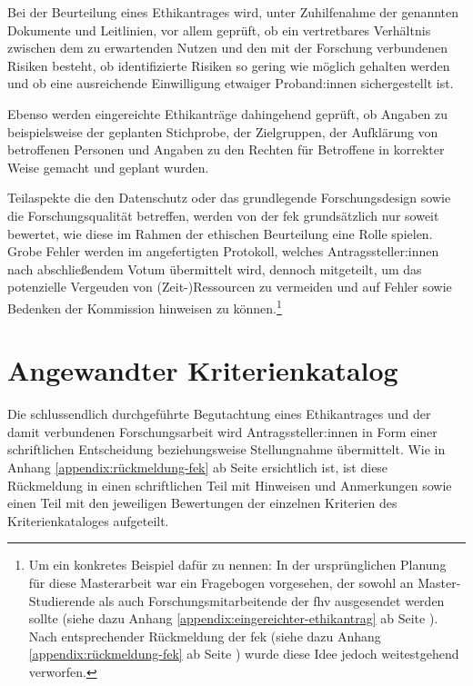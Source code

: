 \documentclass[a4paper,12pt,twoside]{scrreprt}
\begin{document}
Bei der Beurteilung eines Ethikantrages wird, unter Zuhilfenahme der genannten Dokumente und Leitlinien, vor allem geprüft, ob ein vertretbares Verhältnis zwischen dem zu erwartenden Nutzen und den mit der Forschung verbundenen Risiken besteht, ob identifizierte Risiken so gering wie möglich gehalten werden und ob eine ausreichende Einwilligung etwaiger Proband:innen sichergestellt ist. \cite[1\psq]{forschungsethik-kommission_der_fachhochschule_vorarlberg_verfahrensordnung_2020}

Ebenso werden eingereichte Ethikanträge dahingehend geprüft, ob Angaben zu beispielsweise der geplanten Stichprobe, der Zielgruppen, der Aufklärung von betroffenen Personen und Angaben zu den Rechten für Betroffene in korrekter Weise gemacht und geplant wurden. \cite[1\psq]{forschungsethik-kommission_der_fachhochschule_vorarlberg_verfahrensordnung_2020}

Teilaspekte die den Datenschutz oder das grundlegende Forschungsdesign sowie die Forschungsqualität betreffen, werden von der \ac{fek} grundsätzlich nur soweit bewertet, wie diese im Rahmen der ethischen Beurteilung eine Rolle spielen. Grobe Fehler werden im angefertigten Protokoll, welches Antragssteller:innen nach abschließendem Votum übermittelt wird, dennoch mitgeteilt, um das potenzielle Vergeuden von (Zeit-)Ressourcen zu vermeiden und auf Fehler sowie Bedenken der Kommission hinweisen zu können.\footnote{Um ein konkretes Beispiel dafür zu nennen: In der ursprünglichen Planung für diese Masterarbeit war ein Fragebogen vorgesehen, der sowohl an Master-Studierende als auch Forschungsmitarbeitende der \ac{fhv} ausgesendet werden sollte (siehe dazu Anhang \ref{appendix:eingereichter-ethikantrag} ab Seite \pageref{appendix:eingereichter-ethikantrag}). Nach entsprechender Rückmeldung der \ac{fek} (siehe dazu Anhang \ref{appendix:rückmeldung-fek} ab Seite \pageref{appendix:rückmeldung-fek}) wurde diese Idee jedoch weitestgehend verworfen.} \cite[1\psq]{forschungsethik-kommission_der_fachhochschule_vorarlberg_verfahrensordnung_2020}

\section{Angewandter Kriterienkatalog}
\label{sec:angewandter-kriterienkatalog}

Die schlussendlich durchgeführte Begutachtung eines Ethikantrages und der damit verbundenen Forschungsarbeit wird Antragssteller:innen in Form einer schriftlichen Entscheidung beziehungsweise Stellungnahme übermittelt. \cite[4]{forschungsethik-kommission_der_fachhochschule_vorarlberg_verfahrensordnung_2020} Wie in Anhang \ref{appendix:rückmeldung-fek} ab Seite \pageref{appendix:rückmeldung-fek} ersichtlich ist, ist diese Rückmeldung in einen schriftlichen Teil mit Hinweisen und Anmerkungen sowie einen Teil mit den jeweiligen Bewertungen der einzelnen Kriterien des Kriterienkataloges aufgeteilt.
\end{document}
